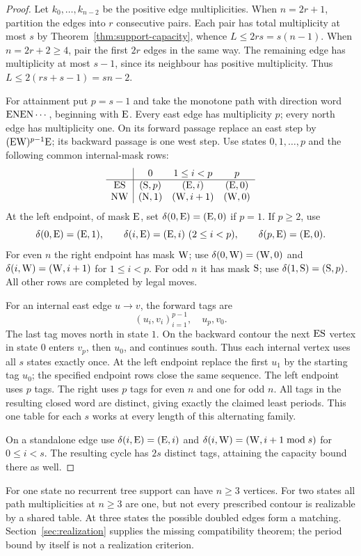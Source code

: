\begin{proof}
Let $k_0,\ldots,k_{n-2}$ be the positive edge multiplicities.
When $n=2r+1$, partition the edges into $r$ consecutive pairs. Each pair has total
multiplicity at most $s$ by Theorem~\ref{thm:support-capacity}, whence
$L\le2rs=s(n-1)$. When $n=2r+2\ge4$, pair the first $2r$ edges in the same way.
The remaining edge has multiplicity at most $s-1$, since its neighbour has positive
multiplicity. Thus $L\le2(rs+s-1)=sn-2$.

For attainment put $p=s-1$ and take the monotone path with direction word
$\mathrm{E}\mathrm{N}\mathrm{E}\mathrm{N}\cdots$, beginning with $\mathrm{E}$. Every east edge has multiplicity $p$;
every north edge has multiplicity one. On its forward passage replace an east step
by $(\mathrm{E}\mathrm{W})^{p-1}\mathrm{E}$; its backward passage is one west step. Use states
$0,1,\ldots,p$ and the following common internal-mask rows:
\[
\begin{array}{c|ccc}
 &0&1\le i<p&p\\\hline
 \mathrm{E}\mathrm{S} &(\mathrm{S},p)&(\mathrm{E},i)&(\mathrm{E},0)\\
 \mathrm{N}\mathrm{W} &(\mathrm{N},1)&(\mathrm{W},i+1)&(\mathrm{W},0)
\end{array}
\]
At the left endpoint, of mask $\mathrm{E}$, set $\delta(0,\mathrm{E})=(\mathrm{E},0)$ if $p=1$.
If $p\ge2$, use
\[
 \delta(0,\mathrm{E})=(\mathrm{E},1),\qquad
 \delta(i,\mathrm{E})=(\mathrm{E},i)\ (2\le i<p),\qquad
 \delta(p,\mathrm{E})=(\mathrm{E},0).
\]
For even $n$ the right endpoint has mask $\mathrm{W}$; use
$\delta(0,\mathrm{W})=(\mathrm{W},0)$ and
$\delta(i,\mathrm{W})=(\mathrm{W},i+1)$ for $1\le i<p$.
For odd $n$ it has mask $\mathrm{S}$; use $\delta(1,\mathrm{S})=(\mathrm{S},p)$.
All other rows are completed by legal moves.

For an internal east edge $u\to v$, the forward tags are
\[
 (u_i,v_i)_{i=1}^{p-1},\quad u_p,v_0.
\]
The last tag moves north in state $1$. On the backward contour the next
$\mathrm{E}\mathrm{S}$ vertex in state $0$ enters $v_p$, then $u_0$, and continues south.
Thus each internal vertex uses all $s$ states exactly once. At the left endpoint
replace the first $u_1$ by the starting tag $u_0$; the specified endpoint rows close
the same sequence. The left endpoint uses $p$ tags. The right uses $p$ tags for even
$n$ and one for odd $n$. All tags in the resulting closed word are distinct, giving
exactly the claimed least periods. This one table for each $s$ works at every length
of this alternating family.

On a standalone edge use $\delta(i,\mathrm{E})=(\mathrm{E},i)$ and
$\delta(i,\mathrm{W})=(\mathrm{W},i+1\bmod s)$ for $0\le i<s$. The resulting cycle has $2s$
distinct tags, attaining the capacity bound there as well.
\end{proof}

For one state no recurrent tree support can have $n\ge3$ vertices. For two states
all path multiplicities at $n\ge3$ are one, but not every prescribed contour is
realizable by a shared table. At three states the possible doubled edges form a
matching. Section~\ref{sec:realization} supplies the missing compatibility theorem;
the period bound by itself is not a realization criterion.

